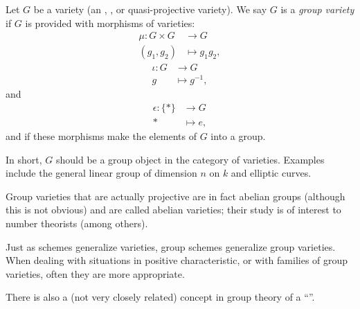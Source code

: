 \documentclass[12pt]{article}
\begin{document}
Let $G$ be a variety (an , , or quasi-projective variety).  We say $G$ is a \emph{group variety} if $G$ is provided with morphisms of varieties:
\begin{align*}
\mu:G\times G &\to G \\
 (g_1,g_2) & \mapsto g_1g_2,
\end{align*}
\begin{align*}
\iota: G &\to G \\
g & \mapsto g^{-1},
\end{align*}
and
\begin{align*}
\epsilon: \{*\} & \to G\\
* & \mapsto e,
\end{align*}
and if these morphisms make the elements of $G$ into a group. 

In short, $G$ should be a group object in the category of varieties.  Examples include the general linear group of dimension $n$ on $k$ and elliptic curves. 

Group varieties that are actually projective are in fact abelian groups (although this is not obvious) and are called abelian varieties; their study is of interest to number theorists (among others).

Just as schemes generalize varieties, group schemes generalize group varieties.  When dealing with situations in positive characteristic, or with families of group varieties, often they are more appropriate.

There is also a (not very closely related) concept in group theory of a ``''.
\end{document}
